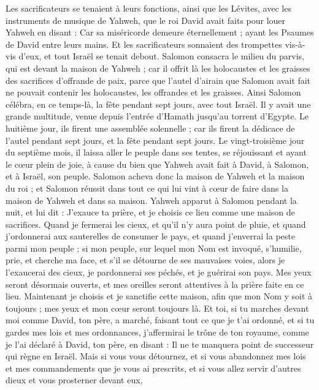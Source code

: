 \begin{multicols}{2}
Les sacrificateurs se tenaient à leurs fonctions, ainsi que les Lévites, avec les instruments de musique de Yahweh, que le roi David avait faits pour louer Yahweh en disant : Car sa miséricorde demeure éternellement ; ayant les Psaumes de David entre leurs mains. Et les sacrificateurs sonnaient des trompettes vis-à-vis d'eux, et tout Israël se tenait debout.
Salomon consacra le milieu du parvis, qui est devant la maison de Yahweh ; car il offrit là les holocaustes et les graisses des sacrifices d’offrande de paix, parce que l'autel d'airain que Salomon avait fait ne pouvait contenir les holocaustes, les offrandes et les graisses.
Ainsi Salomon célébra, en ce temps-là, la fête pendant sept jours, avec tout Israël. Il y avait une grande multitude, venue depuis l'entrée d'Hamath jusqu'au torrent d'Egypte.
Le huitième jour, ils firent une assemblée solennelle ; car ils firent la dédicace de l'autel pendant sept jours, et la fête pendant sept jours.
Le vingt-troisième jour du septième mois, il laissa aller le peuple dans ses tentes, se réjouissant et ayant le cœur plein de joie, à cause du bien que Yahweh avait fait à David, à Salomon, et à Israël, son peuple.
Salomon acheva donc la maison de Yahweh et la maison du roi ; et Salomon réussit dans tout ce qui lui vint à cœur de faire dans la maison de Yahweh et dans sa maison.
Yahweh apparut à Salomon pendant la nuit, et lui dit : J'exauce ta prière, et je choisis ce lieu comme une maison de sacrifices.
Quand je fermerai les cieux, et qu'il n'y aura point de pluie, et quand j’ordonnerai aux sauterelles de consumer le pays, et quand j'enverrai la peste parmi mon peuple ;
si mon peuple, sur lequel mon Nom est invoqué, s'humilie, prie, et cherche ma face, et s'il se détourne de ses mauvaises voies, alors je l'exaucerai des cieux, je pardonnerai ses péchés, et je guérirai son pays.
Mes yeux seront désormais ouverts, et mes oreilles seront attentives à la prière faite en ce lieu.
Maintenant je choisis et je sanctifie cette maison, afin que mon Nom y soit à toujours ; mes yeux et mon cœur seront toujours là.
Et toi, si tu marches devant moi comme David, ton père, a marché, faisant tout ce que je t'ai ordonné, et si tu gardes mes lois et mes ordonnances,
j'affermirai le trône de ton royaume, comme je l'ai déclaré à David, ton père, en disant : Il ne te manquera point de successeur qui règne en Israël.
Mais si vous vous détournez, et si vous abandonnez mes lois et mes commandements que je vous ai prescrits, et si vous allez servir d'autres dieux et vous prosterner devant eux,

\end{multicols}

